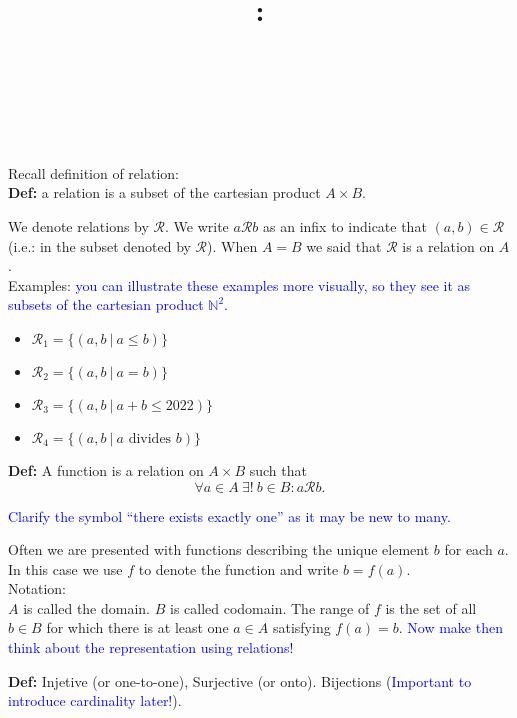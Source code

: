 \documentclass{article}
\title{
    \vspace{2in}
    \textbf{\lectClass:\\ \lectTitle}\\
    \vspace{0.1in}\large{\textit{\lectClassInstructor\ \lectSection}}
    \vspace{3in}
    \author{\textbf{\lectAuthorName}}
    \date{}
}
\begin{document}
\maketitle
\pagebreak

Recall definition of relation:\\

{\bf Def:} a relation is a subset of the cartesian product $A\times B$.

We denote relations by $\mathcal{R}$. We write $a\mathcal{R} b$ as an infix to indicate that $(a,b)\in \mathcal{R}$ (i.e.: in the subset denoted by $\mathcal{R}$). When $A=B$ we said that $\mathcal{R}$ is a relation on $A$.\\

Examples: \textcolor{blue}{you can illustrate these examples more visually, so they see it as subsets of the cartesian product $\mathbb{N}^2$.}\\

\begin{itemize}
    \item $\mathcal{R}_1=\{(a,b~|~ a\leq b)\}$
    \item $\mathcal{R}_2=\{(a,b~|~ a=b)\}$
    \item $\mathcal{R}_3=\{(a,b~|~ a+b\leq 2022)\}$
    \item $\mathcal{R}_4=\{(a,b~|~ a \mbox{ divides } b)\}$
\end{itemize}

{\bf Def:} A function is a relation on $A\times B$ such that 
\[
\forall a\in A~\exists!~ b\in B: a\mathcal{R}b.
\]

\textcolor{blue}{Clarify the symbol ``there exists exactly one'' as it may be new to many. }

Often we are presented with functions describing the unique element $b$ for each $a$. In this case we use $f$ to denote the function and write $b=f(a)$.\\

Notation:\\

$A$ is called the domain. $B$ is called codomain. The range of $f$ is the set of all $b\in B$ for which there is at least one $a\in A$ satisfying $f(a)=b$. \textcolor{blue}{Now make then think about the representation using relations!} 

{\bf Def:} Injetive (or one-to-one), Surjective (or onto). Bijections (\textcolor{blue}{Important to introduce cardinality later!}).\\
\end{document}
